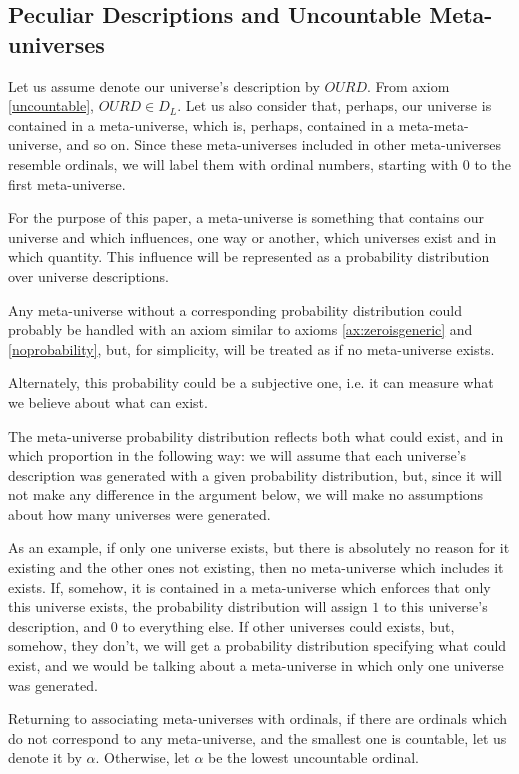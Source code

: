 \documentclass[a4paper
,draft
]{article}
\newcommand{\svn}[2][]{\todo[author=Virgil,color=red!25!white,#1]{#2}}
\def\descriptions{D_L}
\begin{document}
\subsection{Peculiar Descriptions and Uncountable Meta-universes}
\label{fdaumu}
\svn{Use consistent capitalization for section titles.}

Let us assume denote our universe's description by
$OURD$. From axiom \ref{uncountable}, $OURD\in\descriptions$.
Let us also consider that, perhaps, our universe is contained
in a meta-universe, which is, perhaps, contained in
a meta-meta-universe, and so on. Since these meta-universes included in other
meta-universes resemble ordinals, we will label them with ordinal numbers,
starting with $0$ to the first meta-universe.

For the purpose of this paper, a meta-universe is something that contains our
universe and which influences, one way or another, which universes exist and
in which quantity. This influence will be represented as a probability
distribution over universe descriptions.

Any meta-universe without a corresponding probability distribution could
probably be handled with an axiom similar to axioms \ref{ax:zeroisgeneric}
and \ref{noprobability}, but, for simplicity, will be
treated as if no meta-universe exists.

Alternately, this probability could be a subjective one, i.e. it can measure
what we believe about what can exist.

The meta-universe probability distribution reflects both what could exist, and
in which proportion in the following way: we will assume that each universe's
description was generated with a given probability distribution, but, since
it will not make any difference in the argument below, we will make no
assumptions about how many universes were generated.

As an example, if only one universe exists, but there is absolutely no reason
for it existing and the other ones not existing, then no meta-universe which
includes it exists.
If, somehow, it is contained in a meta-universe which
enforces that only this universe exists, the probability distribution will
assign $1$ to this universe's description, and $0$ to everything else.
If other universes could exists, but, somehow, they don't, we will get a
probability distribution specifying what could exist, and we would be talking
about a meta-universe in which only one universe was generated.

Returning to associating meta-universes with ordinals,
if there are ordinals which do not correspond to any meta-universe, and
the smallest one is countable, let us denote it by $\alpha$.
Otherwise, let $\alpha$ be the lowest uncountable ordinal.
\end{document}
